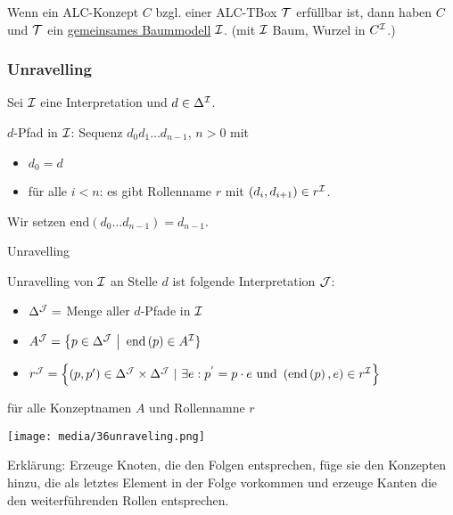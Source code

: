 \begin{theorem}
Wenn ein ALC-Konzept $C$ bzgl. einer ALC-TBox $\mathcal{T}$ erfüllbar ist,
dann haben $C$ und $\mathcal{T}$ ein \underline{gemeinsames Baummodell} $\mathcal{I}$. (mit $\mathcal{I}$ Baum, Wurzel in $C^{\mathcal{I}}$.)
\end{theorem}

\subsubsection{Unravelling}\label{unravelling}

Sei $\mathcal{I}$ eine Interpretation und $d \in \Delta^{\mathcal{I}}$. 

$d$-Pfad in $\mathcal{I}$: Sequenz $d_{0}d_{1}\ldots d_{n - 1}$, $n > 0$ mit

\begin{itemize}
\item
  $d_{0} = d$
\item
  für alle $i < n$: es gibt Rollenname $r$ mit
  $\left( d_{i},d_{i + 1} \right) \in r^{\mathcal{I}}$.
\end{itemize}

Wir setzen
$\text{end}\left( d_{0}\ldots d_{n - 1} \right) = d_{n - 1}$.

\begin{definition}{Unravelling}

Unravelling von $\mathcal{I}$ an Stelle $d$ ist folgende Interpretation $\mathcal{J}$:

\begin{itemize}
\item
  $\Delta^{\mathcal{J}} =$ Menge aller $d$-Pfade in $\mathcal{I}$
\item
  $A^{\mathcal{J}} = \left\{ p \in \Delta^{\mathcal{J}}\  \right|\text{\ end}\left( p \right) \in A^{\mathcal{I}}\}$
\item
  $r^{\MJ} = \left\{ \left( p,p' \right) \in \Delta^{\MJ} \times \Delta^{\MJ}\ |\ \exists e:p^{'} = p \cdot e\ \mathrm{\text{und}}\ \left( \text{end}\left( p \right),e \right) \in r^{\MI} \right\}$
\end{itemize}

für alle Konzeptnamen $A$ und Rollennamne $r$
\end{definition}

\texttt{[image: media/36unraveling.png]}

Erklärung: Erzeuge Knoten, die den Folgen entsprechen, füge sie den
Konzepten hinzu, die als letztes Element in der Folge vorkommen und
erzeuge Kanten die den weiterführenden Rollen entsprechen.

